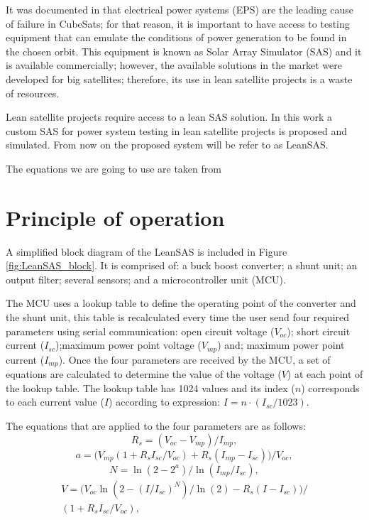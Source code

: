 \documentclass[conference]{IEEEtran}
\begin{document}
It was documented in \cite{reliability} that electrical power systems (EPS) are the leading cause of failure in CubeSats; for that reason, it is important to have access to testing equipment that can emulate the conditions of power generation to be found in the chosen orbit. This equipment is known as Solar Array Simulator (SAS) and it is available commercially; however, the available solutions in the market were developed for big satellites; therefore, its use in lean satellite projects is a waste of resources.

Lean satellite projects require access to a lean SAS solution. In this work a custom SAS for power system testing in lean satellite projects is proposed and simulated. From now on the proposed system will be refer to as LeanSAS.

{\color{red} The equations we are going to use are taken from \cite{equations}}

\section{Principle of operation}
A simplified block diagram of the LeanSAS is included in Figure \ref{fig:LeanSAS_block}. It is comprised of: a buck boost converter; a shunt unit; an output filter; several sensors; and a microcontroller unit (MCU).

The MCU uses a lookup table to define the operating point of the converter and the shunt unit, this table is recalculated every time the user send four required parameters using serial communication: open circuit voltage ($V_{oc}$); short circuit current ($I_{sc}$);maximum power point voltage ($V_{mp}$) and; maximum power point current ($I_{mp}$). Once the four parameters are received by the MCU, a set of equations \cite{equations} are calculated to determine the value of the voltage ($V$) at each point of the lookup table. The lookup table has 1024 values and its index ($n$) corresponds to each current value ($I$) according to expression: $I = n \cdot (I_{sc} / 1023)$. 

The equations that are applied to the four parameters are as follows:
\begin{equation}
    R_s = \left(V_{oc} - V_{mp}\right) / I_{mp},
\end{equation}
\begin{equation}
    a = \bm{(}V_{mp} ( 1 + R_s I_{sc}/ V_{oc}) + R_s ( I_{mp} - I_{sc})\bm{)} / V_{oc},
\end{equation}
\begin{equation}
    N = \ln(2-2^{a}) / \ln(I_{mp}/I_{sc}),
\end{equation}
\begin{multline}
    V = \bm{(} V_{oc} \ln ( 2 - (I/I_{sc})^N ) / \ln(2)  - R_s (I - I_{sc})\bm{)} / \\ (1 + R_s I_{sc}/V_{oc}),
\end{multline}
\end{document}
